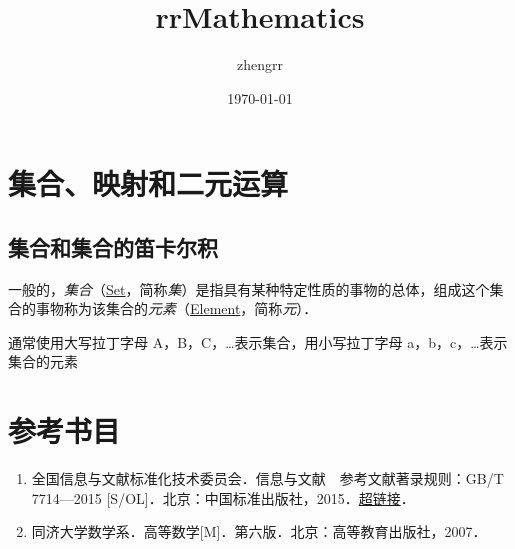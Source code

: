 \documentclass{book}
\begin{document}
\frontmatter

\title{rrMathematics}
\author{zhengrr}
\date{\today}
\maketitle

\tableofcontents

\mainmatter

\chapter{集合、映射和二元运算}

\section{集合和集合的笛卡尔积}

一般的，\emph{集合}（\href{http://mathworld.wolfram.com/Set.html}{Set}，简称\emph{集}）是指具有某种特定性质的事物的总体，组成这个集合的事物称为该集合的\emph{元素}（\href{http://mathworld.wolfram.com/Element.html}{Element}，简称\emph{元}）．

通常使用大写拉丁字母 A，B，C，\dots 表示集合，用小写拉丁字母 a，b，c，\dots 表示集合的元素

\appendix

\chapter{参考书目}

\begin{enumerate}
	\item 全国信息与文献标准化技术委员会．信息与文献　参考文献著录规则：GB/T 7714—2015 [S/OL]．北京：中国标准出版社，2015．\href{http://www.scal.edu.cn/dxtsgxb/201906120155}{超链接}．
	\item 同济大学数学系．高等数学[M]．第六版．北京：高等教育出版社，2007．
\end{enumerate}

\backmatter
\end{document}
